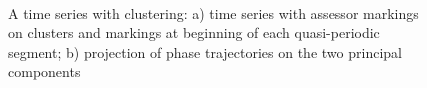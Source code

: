 \documentclass[12pt, twoside]{article}
\numberwithin{equation}{section}
\begin{document}
\begin{figure}[h!t]\center
{}
\\
\caption{A time series with clustering:  a) time series with assessor markings on clusters and markings at beginning of each quasi-periodic segment; b) projection of phase trajectories on the two principal components}
\end{figure}
\end{document}
